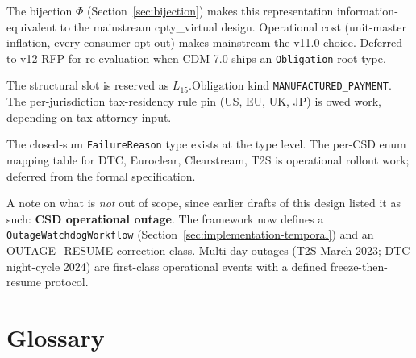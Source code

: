 \documentclass[11pt,a4paper]{article}
\begin{document}
\begin{description}[leftmargin=2em,style=nextline]
\item[First-class unit $u^\circ$ representation] The bijection $\Phi$ (Section~\ref{sec:bijection}) makes this representation information-equivalent to the mainstream cpty\_virtual design. Operational cost (unit-master inflation, every-consumer opt-out) makes mainstream the v11.0 choice. Deferred to v12 RFP for re-evaluation when CDM 7.0 ships an \texttt{Obligation} root type.

\item[Per-jurisdiction manufactured-payment rules] The structural slot is reserved as $L_{15}.\mathrm{Obligation}$ kind \texttt{MANUFACTURED\_PAYMENT}. The per-jurisdiction tax-residency rule pin (US, EU, UK, JP) is owed work, depending on tax-attorney input.

\item[Per-CSD failure-reason normalised mapping] The closed-sum \texttt{FailureReason} type exists at the type level. The per-CSD enum mapping table for DTC, Euroclear, Clearstream, T2S is operational rollout work; deferred from the formal specification.
\end{description}

A note on what is \emph{not} out of scope, since earlier drafts of this design listed it as such: \textbf{CSD operational outage}. The framework now defines a \texttt{OutageWatchdogWorkflow} (Section~\ref{sec:implementation-temporal}) and an OUTAGE\_RESUME correction class. Multi-day outages (T2S March 2023; DTC night-cycle 2024) are first-class operational events with a defined freeze-then-resume protocol.

\clearpage
\section{Glossary}
\label{sec:glossary}
\end{document}
